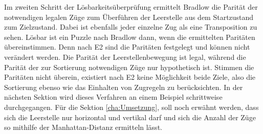 Im zweiten Schritt der Lösbarkeitsüberprüfung ermittelt Bradlow die Parität der notwendigen legalen Züge zum Überführen der Leerstelle aus dem Startzustand zum Zielzustand. Dabei ist ebenfalls jeder einzelne Zug als eine Transposition zu sehen.\WNL%
Lösbar ist ein Puzzle nach Bradlow dann, wenn die ermittelten Paritäten übereinstimmen. Denn nach E2 sind die Paritäten festgelegt und können nicht verändert werden. Die Parität der Leerstellenbewegung ist legal, während die Parität der zur Sortierung notwendigen Züge nur hypothetisch ist. Stimmen die Paritäten nicht überein, existiert nach E2 keine Möglichkeit beide Ziele, also die Sortierung ebenso wie das Einhalten von Zugregeln zu berücksichten.
\WNL
In der nächsten Sektion wird dieses Verfahren an einem Beispiel schrittweise durchgegangen.
\WNL
Für die Sektion \ref*{cha:Umsetzung}, soll noch erwähnt werden, dass sich die Leerstelle nur horizontal und vertikal  darf und sich die Anzahl der Züge so mithilfe der Manhattan-Distanz ermitteln lässt.

